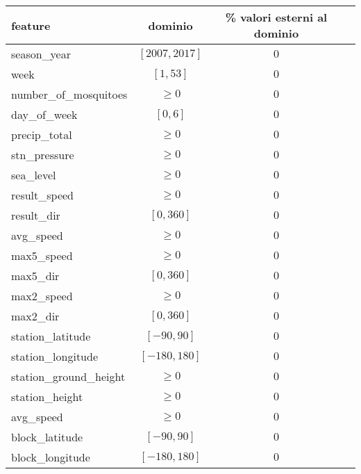 \vspace{.5em}
\begin{centering}
	\begin{tabular}{lccc}
		\toprule
		feature & dominio & \% valori esterni al dominio \\
		\midrule
		season\_year & $[2007, 2017]$ & $0$ \\
		week &	$[1, 53]$ & $0$ \\
		number\_of\_mosquitoes &	$\geq 0$ & $0$ \\
		day\_of\_week &	$[0, 6]$ & $0$ \\
		precip\_total &	$\geq 0$ & $0$ \\
		stn\_pressure &	$\geq 0$ & $0$ \\
		sea\_level &	$\geq 0$ & $0$ \\
		result\_speed &	$\geq 0$ & $0$ \\
		result\_dir &	$[0, 360]$ & $0$ \\
		avg\_speed &	$\geq 0$ & $0$ \\
		max5\_speed &	$\geq 0$ & $0$ \\
		max5\_dir &	$[0, 360]$ & $0$ \\
		max2\_speed &	$\geq 0$ & $0$ \\
		max2\_dir &	$[0, 360]$ & $0$ \\
		station\_latitude & $[-90, 90]$ & $0$ \\
		station\_longitude & $[-180, 180]$ & $0$ \\
		station\_ground\_height &	$\geq 0$ & $0$ \\
		station\_height & $\geq 0$ & $0$ \\
		avg\_speed & $\geq 0$ & $0$ \\
		block\_latitude & $[-90, 90]$ & $0$ \\
		block\_longitude & $[-180, 180]$ & $0$ \\
		\bottomrule
	\end{tabular}
	\label{tab:features-accuracy}
\end{centering}
